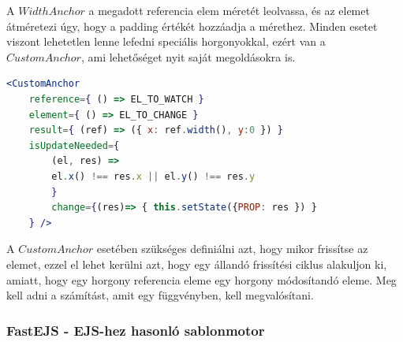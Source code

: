 \documentclass[a4paper,12pt,oneside]{report}
\begin{document}
\begin{justify}
	A $WidthAnchor$ a megadott referencia elem méretét leolvassa, és az elemet átméretezi úgy, hogy a padding értékét hozzáadja a mérethez. Minden esetet viszont lehetetlen lenne lefedni speciális horgonyokkal, ezért van a $CustomAnchor$, ami lehetőséget nyit saját megoldásokra is.

	\begin{lstlisting}[language=jsx]
	<CustomAnchor 
	reference={ () => EL_TO_WATCH }
	element={ () => EL_TO_CHANGE }
	result={ (ref) => ({ x: ref.width(), y:0 }) }
	isUpdateNeeded={
		(el, res) => 
		el.x() !== res.x || el.y() !== res.y 
		}
        change={(res)=> { this.setState({PROP: res }) } 
    } />
	\end{lstlisting}

	A $CustomAnchor$ esetében szükséges definiálni azt, hogy mikor frissítse az elemet, ezzel el lehet kerülni azt, hogy egy állandó frissítési ciklus alakuljon ki, amiatt, hogy egy horgony referencia eleme egy horgony módosítandó eleme. Meg kell adni a számítást, amit egy függvényben, kell megvalósítani.

\end{justify}

\newpage
\subsubsection{FastEJS - EJS-hez hasonló sablonmotor}
\end{document}
